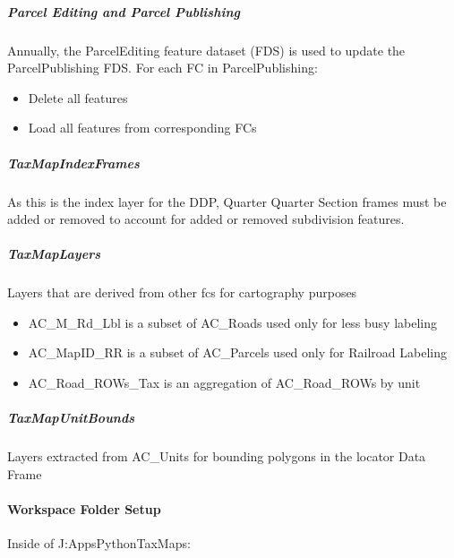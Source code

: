 \subparagraph{Parcel Editing and Parcel Publishing}
Annually, the ParcelEditing feature dataset (FDS) is used to update the ParcelPublishing FDS.  For each FC in ParcelPublishing:
\begin{itemize}
\item Delete all features
\item Load all features from corresponding FCs
\end{itemize}
\begin{table}[htbp]
\centering
{}

\end{table}
\clearpage
\subparagraph{TaxMapIndexFrames}As this is the index layer for the DDP, Quarter Quarter Section frames must be added or removed to account for added or removed subdivision features.
\subparagraph{TaxMapLayers}Layers that are derived from other fcs for cartography purposes
\begin{itemize}
\item AC\_M\_Rd\_Lbl is a subset of AC\_Roads used only for less busy labeling
\item AC\_MapID\_RR is a subset of AC\_Parcels used only for Railroad Labeling
\item AC\_Road\_ROWs\_Tax is an aggregation of AC\_Road\_ROWs by unit
\end{itemize}
\subparagraph{TaxMapUnitBounds}Layers extracted from AC\_Units for bounding polygons in the locator Data Frame
\clearpage
\paragraph{Workspace Folder Setup}Inside of J:{\menuArrow}Apps{\menuArrow}Python{\menuArrow}TaxMaps:

